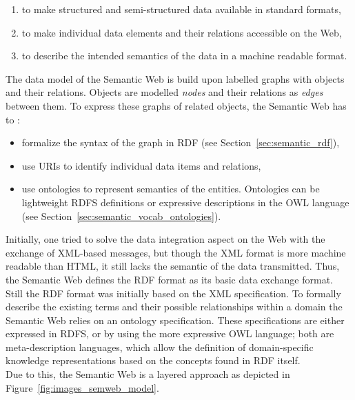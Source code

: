 \begin{enumerate}
	\item to make structured and semi-structured data available in standard formats,
	\item to make individual data elements and their relations accessible on the Web,
	\item to describe the intended semantics of the data in a machine readable format.
\end{enumerate}

The data model of the Semantic Web is build upon labelled graphs with objects and their relations. Objects are modelled \emph{nodes} and their relations as \emph{edges} between them. To express these graphs of related objects, the Semantic Web has to \citep[pg. 1-22]{antoniou2012semantic}: \@

\begin{itemize}
	\item formalize the syntax of the graph in \gls{RDF} (see Section~\ref{sec:semantic_rdf}),
	\item use \gls{URI}s to identify individual data items and relations,
	\item use ontologies to represent semantics of the entities. Ontologies can be lightweight \gls{RDFS} definitions or expressive descriptions in the \gls{OWL} language (see Section~\ref{sec:semantic_vocab_ontologies}).
\end{itemize}

Initially, one tried to solve the data integration aspect on the Web with the exchange of \gls{XML}-based messages, but though the \gls{XML} format is more machine readable than \gls{HTML}, it still lacks the semantic of the data transmitted. Thus, the Semantic Web defines the \gls{RDF} format as its basic data exchange format. Still the \gls{RDF} format was initially based on the \gls{XML} specification. To formally describe the existing terms and their possible relationships within a domain the Semantic Web relies on an ontology specification. These specifications are either expressed in \gls{RDFS}, or by using the more expressive \gls{OWL} language; both are meta-description languages, which allow the definition of domain-specific knowledge representations based on the concepts found in \gls{RDF} itself. \\

Due to this, the Semantic Web is a layered approach as depicted in Figure~\ref{fig:images_semweb_model}.\@

